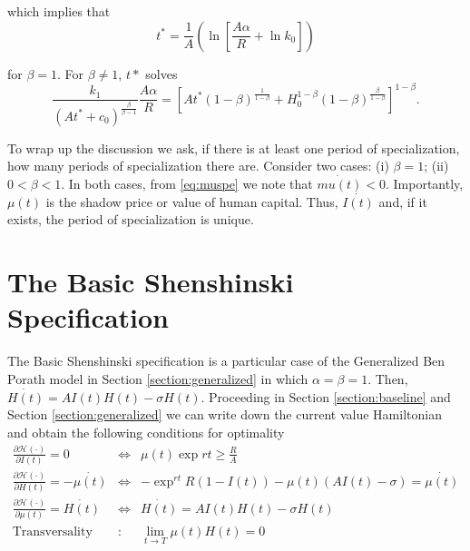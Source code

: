 \noindent which implies that 
\begin{equation}
t^* = \frac{1}{A} \left( \ln \left[ \frac{A\alpha}{R} + \ln k_{0} \right] \right)
\end{equation}

\noindent for $\beta = 1$. For $\beta \neq 1$, $t*$ solves
\begin{equation}
\frac{k_{1}}{ \left( At^* + c_{0} \right)^{\frac{\beta}{\beta-1}}} \frac{A \alpha}{R} = \left[ At^* \left( 1 - \beta \right)^{\frac{1}{1 - \beta}} + H_{0}^{1 - \beta} \left( 1 - \beta \right)^{\frac{\beta}{1 - \beta}} \right]^{1 - \beta}.
\end{equation}

\indent To wrap up the discussion we ask, if there is at least one period of specialization, how many periods of specialization there are. Consider two cases: (i) $\beta = 1$; (ii) $0 < \beta < 1$. In both cases, from \eqref{eq:muspe} we note that $\dot{mu(t)} < 0$. Importantly, $\mu(t)$ is the shadow price or value of human capital. Thus, $\dot{I(t)}$ and, if it exists, the period of specialization is unique.
 
\section{The Basic Shenshinski Specification}
The Basic Shenshinski specification is a particular case of the Generalized Ben Porath model in Section \ref{section:generalized} in which $\alpha = \beta = 1$. Then, $\dot{H(t)} = AI(t)H(t) - \sigma H(t)$. Proceeding in Section \ref{section:baseline} and Section \ref{section:generalized} we can write down the current value Hamiltonian and obtain the following conditions for optimality
\begin{eqnarray}
\frac{\partial \mathcal{H} (\cdot)}{\partial I(t)} = 0 &\Leftrightarrow& \mu(t) \exp{rt} \geq \frac{R}{A} \label{eq:focinvestmentshenbasic} \\
\frac{\partial \mathcal{H} (\cdot)}{\partial H(t)} = - \dot{\mu(t)} &\Leftrightarrow& - \exp^{rt} R(1 - I(t)) - \mu(t) \left( A I(t) - \sigma \right) = \dot{\mu(t)} \label{eq:focstockshenbasic} \\ 
\frac{\partial \mathcal{H} (\cdot)}{\partial \mu(t)} = \dot{H(t)} &\Leftrightarrow& \dot{H(t)} =  A I(t) H(t)- \sigma H(t) \label{eq:focmotionshenbasic} \\
\text{Transversality} &:& \lim_{t \rightarrow T} \mu(t) H(t) = 0 \label{eq:foctransversalityshenbasic}
\end{eqnarray}

